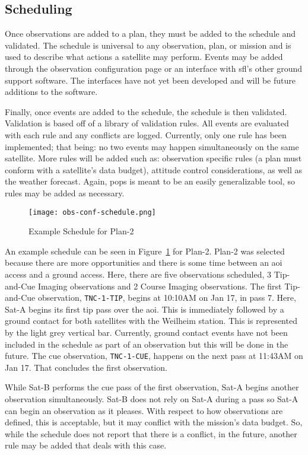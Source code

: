 \subsection{Scheduling}


Once observations are added to a plan, they must be added to the schedule and
validated. The schedule is universal to any observation, plan, or mission and
is used to describe what actions a satellite may perform. Events may be added
through the observation configuration page or an interface with \gls{sfl}’s
other ground support software. The interfaces have not yet been developed and
will be future additions to the software.

Finally, once events are added to the schedule, the schedule is then validated.
Validation is based off of a library of validation rules. All events are
evaluated with each rule and any conflicts are logged. Currently, only one rule
has been implemented; that being: no two events may happen simultaneously on
the same satellite. More rules will be added such as: observation specific
rules (a plan must conform with a satellite’s data budget), attitude control
considerations, as well as the weather forecast. Again, \gls{pops} is meant to
be an easily generalizable tool, so rules may be added as necessary.


\begin{figure}[h]
    \centering
    \texttt{[image: obs-conf-schedule.png]} 
    \caption{Example Schedule for Plan-2}
    \label{fig:obs-conf-schedule}
\end{figure}

An example schedule can be seen in Figure~\ref{fig:obs-conf-schedule} for
Plan-2. Plan-2 was selected because there are more opportunities and there is
some time between an \gls{aoi} access and a ground access. Here, there are five
observations scheduled, 3 Tip-and-Cue Imaging observations and 2 Course Imaging
observations. The first Tip-and-Cue observation, \texttt{TNC-1-TIP}, begins at
10:10AM on Jan 17, in pass 7. Here, Sat-A begins its first tip pass over the
\gls{aoi}.  This is immediately followed by a ground contact for both
satellites with the Weilheim station. This is represented by the light grey
vertical bar.  Currently, ground contact events have not been included in the
schedule as part of an observation but this will be done in the future.  The
cue observation, \texttt{TNC-1-CUE}, happens on the next pass at 11:43AM on Jan
17.  That concludes the first observation.

While Sat-B performs the cue pass of the first observation, Sat-A begins
another observation simultaneously. Sat-B does not rely on Sat-A during a pass
so Sat-A can begin an observation as it pleases. With respect to how
observations are defined, this is acceptable, but it may conflict with the
mission's data budget. So, while the schedule does not report that there is a
conflict, in the future, another rule may be added that deals with this case.


